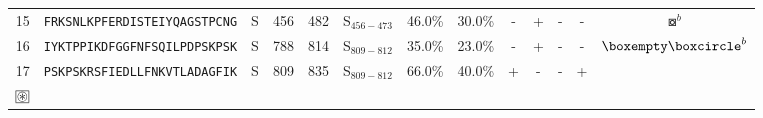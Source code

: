 \begin{tabular}{rcccccccccccc}
15 &  \texttt{FRKSNLKPFERDISTEIYQAGSTPCNG} &       S &    456 &   482 &  S$_{456-473}$ &                          46.0\% &                           30.0\% &          - &           + &          - &           - &                                                                                                    $ \boxcircle^b $ \\
16 &  \texttt{IYKTPPIKDFGGFNFSQILPDPSKPSK} &       S &    788 &   814 &  S$_{809-812}$ &                          35.0\% &                           23.0\% &          - &           + &          - &           - &                                                                                          $ \boxempty \boxcircle^b $ \\
17 &  \texttt{PSKPSKRSFIEDLLFNKVTLADAGFIK} &       S &    809 &   835 &  S$_{809-812}$ &                          66.0\% &                           40.0\% &          + &           - &          - &           + &  \Centerstack{  $\boxast \boxast^b \boxcircle \boxcircle^d$ \\  $\setlength{\fboxsep}{0.5pt} \boxed{\circledast}$ } \\
\bottomrule
\end{tabular}
